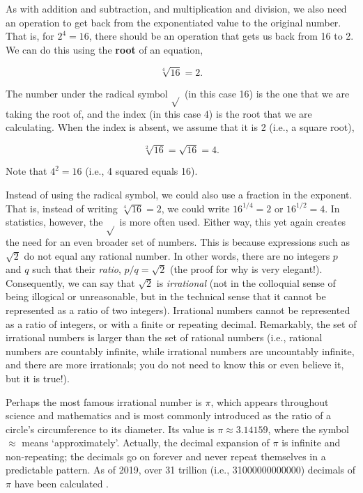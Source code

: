 \documentclass[
]{scrbook}
\begin{document}
As with addition and subtraction, and multiplication and division, we also need an operation to get back from the exponentiated value to the original number.
That is, for \(2^{4} = 16\), there should be an operation that gets us back from 16 to 2.
We can do this using the \textbf{root} of an equation,

\[\sqrt[4]{16} = 2.\]

The number under the radical symbol \(\sqrt{}\) (in this case 16) is the one that we are taking the root of, and the index (in this case 4) is the root that we are calculating.
When the index is absent, we assume that it is 2 (i.e., a square root),

\[\sqrt[2]{16} = \sqrt{16} = 4.\]

Note that \(4^{2} = 16\) (i.e., 4 squared equals 16).

Instead of using the radical symbol, we could also use a fraction in the exponent.
That is, instead of writing \(\sqrt[4]{16} = 2\), we could write \(16^{1/4} = 2\) or \(16^{1/2} = 4\).
In statistics, however, the \(\sqrt{}\) is more often used.
Either way, this yet again creates the need for an even broader set of numbers.
This is because expressions such as \(\sqrt{2}\) do not equal any rational number.
In other words, there are no integers \(p\) and \(q\) such that their \emph{ratio}, \(p/q = \sqrt{2}\) (the proof for why is very elegant!).
Consequently, we can say that \(\sqrt{2}\) is \emph{irrational} (not in the colloquial sense of being illogical or unreasonable, but in the technical sense that it cannot be represented as a ratio of two integers).
Irrational numbers cannot be represented as a ratio of integers, or with a finite or repeating decimal.
Remarkably, the set of irrational numbers is larger than the set of rational numbers (i.e., rational numbers are countably infinite, while irrational numbers are uncountably infinite, and there are more irrationals; you do not need to know this or even believe it, but it is true!).

Perhaps the most famous irrational number is \(\pi\), which appears throughout science and mathematics and is most commonly introduced as the ratio of a circle's circumference to its diameter.
Its value is \(\pi \approx 3.14159\), where the symbol \(\approx\) means `approximately'.
Actually, the decimal expansion of \(\pi\) is infinite and non-repeating; the decimals go on forever and never repeat themselves in a predictable pattern.
As of 2019, over 31 trillion (i.e., 31000000000000) decimals of \(\pi\) have been calculated \citep{Yee2019}.
\end{document}
